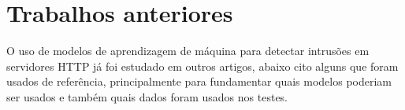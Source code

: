 
\chapter{Trabalhos anteriores}
\label{cap:fundamentation}

O uso de modelos de aprendizagem de máquina para detectar intrusões em servidores HTTP 
já foi estudado em outros artigos, abaixo cito alguns que foram usados de referência, 
principalmente para fundamentar quais modelos poderiam ser usados e também quais dados
foram usados nos testes. 

